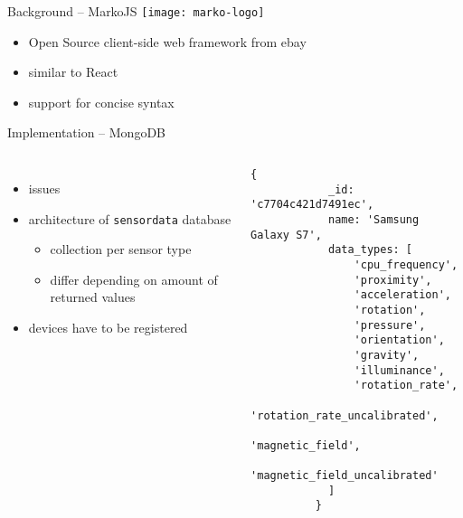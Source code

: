 \documentclass[aspectratio=1610]{beamer}
\begin{document}
  \begin{frame}{Background -- MarkoJS}
    \texttt{[image: marko-logo]}

    \vspace*{2em}

    \begin{itemize}
      \item Open Source client-side web framework from ebay
      \item similar to React
      \item support for concise syntax
    \end{itemize}
  \end{frame}

  \begin{frame}[fragile]{Implementation -- MongoDB}
    \begin{columns}
        \begin{itemize}
          \item issues
          \item architecture of \texttt{sensordata} database
            \begin{itemize}
              \item collection per sensor type
              \item differ depending on amount of returned values
            \end{itemize}
          \item devices have to be registered
        \end{itemize}
          \begin{lstlisting}[language=mongo, basicstyle=\scriptsize\ttfamily]
          {
            _id: 'c7704c421d7491ec',
            name: 'Samsung Galaxy S7',
            data_types: [
                'cpu_frequency',
                'proximity',
                'acceleration',
                'rotation',
                'pressure',
                'orientation',
                'gravity',
                'illuminance',
                'rotation_rate',
                'rotation_rate_uncalibrated',
                'magnetic_field',
                'magnetic_field_uncalibrated'
            ]
          }
          \end{lstlisting}
     \end{columns}
  \end{frame}
\end{document}
